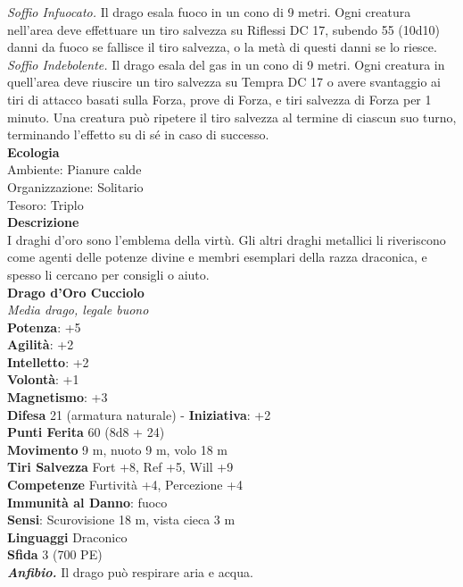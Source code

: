 \begin{multicols}{2}
\emph{Soffio Infuocato.} Il drago esala fuoco in un cono di 9 metri. Ogni creatura nell'area deve effettuare un tiro salvezza su Riflessi DC 17, subendo 55 (10d10) danni da fuoco se fallisce il tiro salvezza, o la metà di questi danni se lo riesce.\\
\emph{Soffio Indebolente.} Il drago esala del gas in un cono di 9 metri. Ogni creatura in quell'area deve riuscire un tiro salvezza su Tempra DC 17 o avere svantaggio ai tiri di attacco basati sulla Forza, prove di Forza, e tiri salvezza di Forza per 1 minuto. Una creatura può ripetere il tiro salvezza al termine di ciascun suo turno, terminando l'effetto su di sé in caso di successo.\\
\textbf{Ecologia}\\
Ambiente: Pianure calde\\
Organizzazione: Solitario\\
Tesoro: Triplo\\
\textbf{Descrizione}\\
I draghi d'oro sono l'emblema della virtù. Gli altri draghi metallici li riveriscono come agenti delle potenze divine e membri esemplari della razza draconica, e spesso li cercano per consigli o aiuto.\\
\medskip\textbf{Drago d'Oro Cucciolo}\\
\emph{Media drago, legale buono}\\
\textbf{Potenza}: +5\\
\textbf{Agilità}: +2\\
\textbf{Intelletto}: +2\\
\textbf{Volontà}: +1\\
\textbf{Magnetismo}: +3\\
\textbf{Difesa} 21 (armatura naturale) - \textbf{Iniziativa}: +2\\
\textbf{Punti Ferita} 60 (8d8 + 24)\\
\textbf{Movimento} 9 m, nuoto 9 m, volo 18 m\\
\textbf{Tiri Salvezza} Fort +8, Ref +5, Will +9\\
\textbf{Competenze} Furtività +4, Percezione +4\\
\textbf{Immunità al Danno}: fuoco\\
\textbf{Sensi}: Scurovisione 18 m, vista cieca 3 m \\
\textbf{Linguaggi} Draconico\\
\textbf{Sfida} 3 (700 PE)\smallskip\\
\emph{\textbf{Anfibio.}} Il drago può respirare aria e acqua.\\

\end{multicols}
